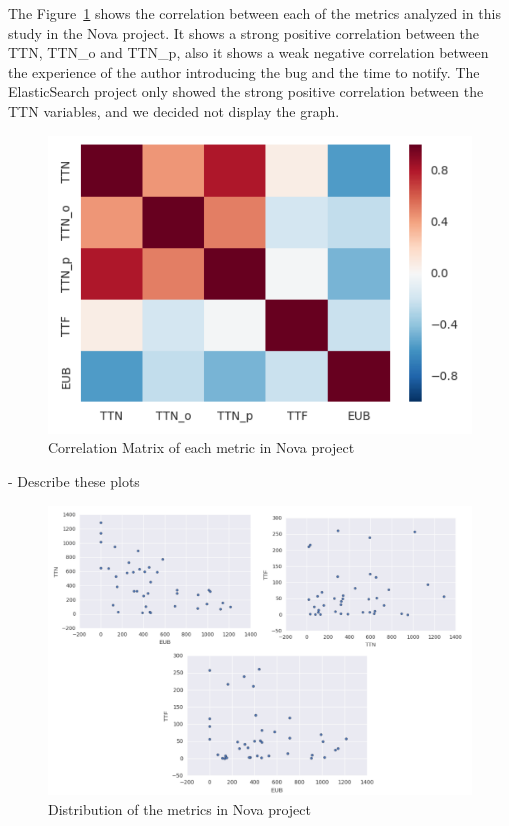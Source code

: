 \documentclass[10pt, conference]{IEEEtran}
\begin{document}
The Figure~\ref{fig:correlation} shows the correlation between each of the metrics analyzed in this study in the Nova project. It shows a strong positive correlation between the TTN, TTN\_o and TTN\_p, also it shows a weak negative correlation between the experience of the author introducing the bug and the time to notify. The ElasticSearch project only showed the strong positive correlation between the TTN variables, and we decided not display the graph.

\begin{figure}[ht]
\centering
\includegraphics[width=\columnwidth]{correlationMatrix.png}
\caption{Correlation Matrix of each metric in Nova project}
\label{fig:correlation}       %
\end{figure}

- Describe these plots
\begin{figure}[ht]
\centering
\includegraphics[width=\columnwidth]{DistributionNova_b.png}
\caption{Distribution of the metrics in Nova project}
\label{fig:graph2}       %
\end{figure}
\end{document}
